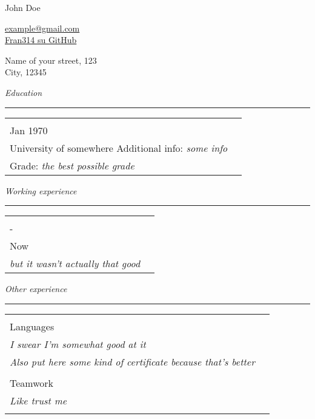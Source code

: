 \documentclass[a4paper, 11pt]{article}
\newcommand{\name}[1]{
    \begin{center}
        \huge #1
    \end{center}
}
\newcommand{\header}[2]{
    \noindent
    \begin{minipage}[t]{0.4\textwidth} 
        #1
    \end{minipage}
    \hfill
    \begin{minipage}[t]{0.4\textwidth}
        \raggedleft
        #2
    \end{minipage}
}
\newenvironment{labelblock}[2][60pt]{
    \newcommand{\entry}[2]{
          & \\[-10pt]
        \centering ##1 & 
        \begin{minipage}[t]{\textwidth - #1 - 30pt}
            ##2
        \end{minipage}\\
    }
    \newcommand{\separator}{
        & \\
    }

    \vspace{20pt}
    \noindent\hspace{10pt}\textit{#2}\\[-10pt]
    \rule{\textwidth}{0.4pt}
    \begin{tabular}{p{#1} | l}
}{
    \end{tabular}
}
\begin{document}
    \name{John Doe}

    \header{
        \href{mailto:{example@gmail.com}}{example@gmail.com}\\
        \href{https://github.com/Fran314}{Fran314 su GitHub}
    }{
        Name of your street, 123\\
        City, 12345
    }

    \begin{labelblock}{Education}
        \entry{Jan 1970}{
            \textbf{Bachelor degree in something}\\
            University of somewhere
            Additional info: \textit{some info}\\
            Grade: \textit{the best possible grade}
        }
    \end{labelblock}

    \begin{labelblock}{Working experience}
        \entry{1970-\\Now}{
            \textbf{Some job title that hopefully sounds good}\\
            \textit{but it wasn't actually that good}
        }
    \end{labelblock}

    \begin{labelblock}{Other experience}
        \entry{Languages}{
            \textbf{Great knowledge of the English language}\\
            \textit{I swear I'm somewhat good at it}\\
            \textit{Also put here some kind of certificate because that's better}
        }
        \entry{Teamwork}{
            \textbf{Great teamworker}\\
            \textit{Like trust me}\\
        }
    \end{labelblock}
\end{document}
